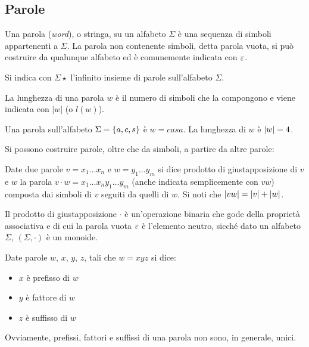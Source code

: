 \subsection*{Parole}
\begin{defin}[parola]
	Una parola (\emph{word}), o stringa, su un alfabeto $\Sigma$ è una sequenza di simboli appartenenti a $\Sigma$. La parola non contenente simboli, detta parola vuota, si può costruire da qualunque alfabeto ed è comunemente indicata con $\varepsilon$.

	Si indica con $\Sigma\star$ l'infinito insieme di parole sull'alfabeto $\Sigma$.
\end{defin}
La lunghezza di una parola $w$ è il numero di simboli che la compongono e viene indicata con $|w|$ (o $l(w)$).
\begin{examp}
	Una parola sull'alfabeto $\Sigma=\left\{ a,c,s \right\}$ è $w=casa$. La lunghezza di $w$ è $|w|=4$.
\end{examp}
Si possono costruire parole, oltre che da simboli, a partire da altre parole:
\begin{defin}
	Date due parole $v=x_1\dots x_n$ e $w=y_1\dots y_m$ si dice prodotto di giustapposizione di $v$ e $w$ la parola $v\cdot w=x_1\dots x_n y_1\dots y_m$ (anche indicata semplicemente con $vw$) composta dai simboli di $v$ seguiti da quelli di $w$. Si noti che $|vw|=|v|+|w|$.
\end{defin}
Il prodotto di giustapposizione $\cdot$ è un'operazione binaria che gode della proprietà associativa e di cui la parola vuota $\varepsilon$ è l'elemento neutro, sicché dato un alfabeto $\Sigma$, $(\Sigma,\cdot)$ è un monoide.
\begin{defin}
	Date parole $w$, $x$, $y$, $z$, tali che $w=xyz$ si dice:
	\begin{itemize}
		\item $x$ è prefisso di $w$
		\item $y$ è fattore di $w$
		\item $z$ è suffisso di $w$
	\end{itemize}
\end{defin}
Ovviamente, prefissi, fattori e suffissi di una parola non sono, in generale, unici.


